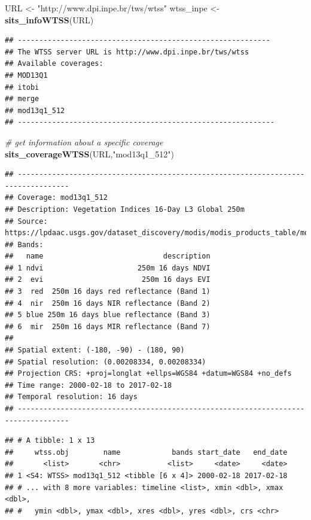 \documentclass[11pt,]{article}
\newenvironment{Shaded}{\begin{snugshade}}{\end{snugshade}}
\newcommand{\KeywordTok}[1]{\textcolor[rgb]{0.13,0.29,0.53}{\textbf{#1}}}
\newcommand{\StringTok}[1]{\textcolor[rgb]{0.31,0.60,0.02}{#1}}
\newcommand{\CommentTok}[1]{\textcolor[rgb]{0.56,0.35,0.01}{\textit{#1}}}
\newcommand{\NormalTok}[1]{#1}
\begin{document}
\begin{Shaded}
\begin{Highlighting}[]
\NormalTok{URL <-}\StringTok{ "http://www.dpi.inpe.br/tws/wtss"}
\NormalTok{wtss_inpe <-}\StringTok{ }\KeywordTok{sits_infoWTSS}\NormalTok{(URL)}
\end{Highlighting}
\end{Shaded}

\begin{verbatim}
## -----------------------------------------------------------
## The WTSS server URL is http://www.dpi.inpe.br/tws/wtss
## Available coverages: 
## MOD13Q1
## itobi
## merge
## mod13q1_512
## ------------------------------------------------------------
\end{verbatim}

\begin{Shaded}
\begin{Highlighting}[]
\CommentTok{# get information about a specific coverage}
\KeywordTok{sits_coverageWTSS}\NormalTok{(URL,}\StringTok{"mod13q1_512"}\NormalTok{)}
\end{Highlighting}
\end{Shaded}

\begin{verbatim}
## ----------------------------------------------------------------------------------
## Coverage: mod13q1_512
## Description: Vegetation Indices 16-Day L3 Global 250m
## Source: https://lpdaac.usgs.gov/dataset_discovery/modis/modis_products_table/mod13q1
## Bands: 
##   name                            description
## 1 ndvi                      250m 16 days NDVI
## 2  evi                       250m 16 days EVI
## 3  red  250m 16 days red reflectance (Band 1)
## 4  nir  250m 16 days NIR reflectance (Band 2)
## 5 blue 250m 16 days blue reflectance (Band 3)
## 6  mir  250m 16 days MIR reflectance (Band 7)
## 
## Spatial extent: (-180, -90) - (180, 90)
## Spatial resolution: (0.00208334, 0.00208334)
## Projection CRS: +proj=longlat +ellps=WGS84 +datum=WGS84 +no_defs
## Time range: 2000-02-18 to 2017-02-18
## Temporal resolution: 16 days 
## ----------------------------------------------------------------------------------
\end{verbatim}

\begin{verbatim}
## # A tibble: 1 x 13
##     wtss.obj        name            bands start_date   end_date
##       <list>       <chr>           <list>     <date>     <date>
## 1 <S4: WTSS> mod13q1_512 <tibble [6 x 4]> 2000-02-18 2017-02-18
## # ... with 8 more variables: timeline <list>, xmin <dbl>, xmax <dbl>,
## #   ymin <dbl>, ymax <dbl>, xres <dbl>, yres <dbl>, crs <chr>
\end{verbatim}
\end{document}
